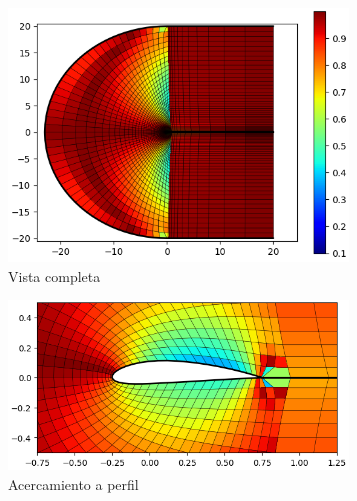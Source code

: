 \documentclass[letterpaper, openright, 12pt]{book}
\begin{document}
    \begin{figure}[htbp!]
        \centering
        \begin{subfigure}[c]{0.48\textwidth}
            \includegraphics[keepaspectratio, width=0.99\textwidth]
                {./img/naca4415_c_skew_far}
            \caption{Vista completa}
            \label{fig:naca4415_c_skew_far}
        \end{subfigure}
        \hfill
        \begin{subfigure}[c]{0.48\textwidth}
            \includegraphics[keepaspectratio, width=0.99\textwidth]
                {./img/naca4415_c_skew_close}
            \caption{Acercamiento a perfil}
            \label{fig:naca4415_c_skew_close}
        \end{subfigure}
        \begin{subfigure}[c]{0.48\textwidth}

\end{subfigure}
\end{figure}
\end{document}
